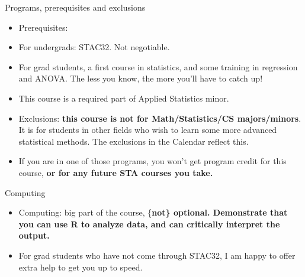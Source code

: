\documentclass[ignorenonframetext,]{beamer}
\begin{document}
\begin{frame}{Programs, prerequisites and exclusions}
\protect\hypertarget{programs-prerequisites-and-exclusions}{}

\begin{itemize}
\item
  Prerequisites:
\item
  For undergrads: STAC32. Not negotiable.
\item
  For grad students, a first course in statistics, and some training in
  regression and ANOVA. The less you know, the more you'll have to catch
  up!
\item
  This course is a required part of Applied Statistics minor.
\item
  Exclusions: \textbf{this course is not for
  Math/Statistics/CS majors/minors}. It is for students in other fields
  who wish to learn some more advanced statistical methods. The
  exclusions in the Calendar reflect this.
\item
  If you are in one of those programs, you won't get program credit for
  this course, \textbf{or for any future STA courses you take.}
\end{itemize}

\end{frame}

\begin{frame}{Computing}
\protect\hypertarget{computing}{}

\begin{itemize}
\item
  Computing: big part of the course, \{\bf not\} optional. Demonstrate
  that you can use R to analyze data, and can critically interpret the
  output.
\item
  For grad students who have not come through STAC32, I am happy to
  offer extra help to get you up to speed.
\end{itemize}

\end{frame}
\end{document}
